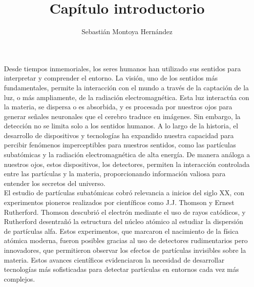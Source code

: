 \documentclass{article}
\title{\textbf{Capítulo introductorio}}
\author{Sebastián Montoya Hernández}
\begin{document}
\maketitle 
\setcounter{section}{0}

\noindent Desde tiempos inmemoriales, los seres humanos han utilizado sus sentidos para interpretar y comprender el entorno. La visión, uno de los sentidos más fundamentales, permite la interacción con el mundo a través de la captación de la luz, o más ampliamente, de la radiación electromagnética. Esta luz interactúa con la materia, se dispersa o es absorbida, y es procesada por nuestros ojos para generar señales neuronales que el cerebro traduce en imágenes. Sin embargo, la detección no se limita solo a los sentidos humanos. A lo largo de la historia, el desarrollo de dispositivos y tecnologías ha expandido nuestra capacidad para percibir fenómenos imperceptibles para nuestros sentidos, como las partículas subatómicas y la radiación electromagnética de alta energía. De manera análoga a nuestros ojos, estos dispositivos, los detectores, permiten la interacción controlada entre las partículas y la materia, proporcionando información valiosa para entender los secretos del universo.\\

\noindent El estudio de partículas subatómicas cobró relevancia a inicios del siglo XX, con experimentos pioneros realizados por científicos como J.J. Thomson y Ernest Rutherford. Thomson descubrió el electrón mediante el uso de rayos catódicos, y Rutherford desentrañó la estructura del núcleo atómico al estudiar la dispersión de partículas alfa. Estos experimentos, que marcaron el nacimiento de la física atómica moderna, fueron posibles gracias al uso de detectores rudimentarios pero innovadores, que permitieron observar los efectos de partículas invisibles sobre la materia. Estos avances científicos evidenciaron la necesidad de desarrollar tecnologías más sofisticadas para detectar partículas en entornos cada vez más complejos.\\
\end{document}
